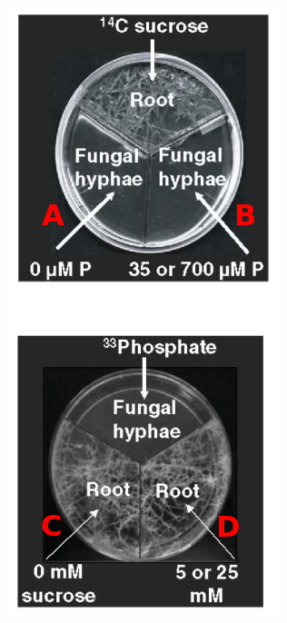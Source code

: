 {\begin{noheadline}
\begin{frame}[t]
\begin{adjustwidth}{-2em}{-1.5em}
\begin{columns}[t]
            \includegraphics[width=\columnwidth]{fungus-plates-labeled.png}

        \end{columns}
    \end{adjustwidth}
\end{frame}
\end{noheadline}
}

